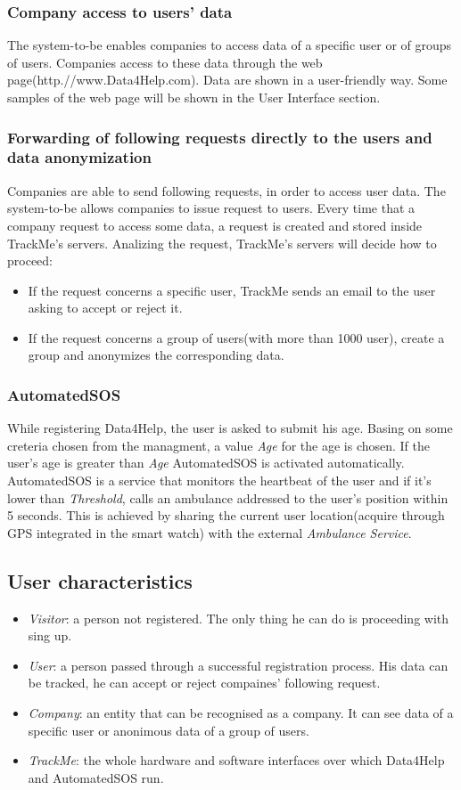 \documentclass{article}
\begin{document}
\subsubsection{Company access to users' data}
The system-to-be enables companies to access data of a specific user or of groups of users. Companies access to these data through the web page(http.//www.Data4Help.com). Data are shown in a user-friendly way. Some samples of the web page will be shown in the User Interface section.
\subsubsection{Forwarding of following requests directly to the users and data anonymization}
Companies are able to send following requests, in order to access user data. The system-to-be allows companies to issue request to users. Every time that a company request to access some data, a request is created and stored inside TrackMe's servers. Analizing the request, TrackMe's servers will decide how to proceed:\\
\begin{itemize}
\item If the request concerns a specific user, TrackMe sends an email to the user asking to accept or reject it.
\item If the request concerns a group of users(with more than 1000 user), create a group and anonymizes the corresponding data. 
\end{itemize}
\subsubsection{AutomatedSOS}
While registering Data4Help, the user is asked to submit his age. Basing on some creteria chosen from the managment, a value \emph{Age} for the age is chosen. If the user's age is greater than \emph{Age} AutomatedSOS is activated automatically. AutomatedSOS is a service that monitors the heartbeat of the user and if it's lower than \emph{Threshold}, calls an ambulance addressed to the user's position within 5 seconds. This is achieved by sharing the current user location(acquire through GPS integrated in the smart watch) with the external \emph{Ambulance Service}.
\subsection{User characteristics}
\begin{itemize}
\item \emph{Visitor}: a person not registered. The only thing he can do is proceeding with sing up.
\item \emph{User}: a person passed through a successful registration process. His data can be tracked, he can accept or reject compaines' following request.
 \item \emph{Company}: an entity that can be recognised as a company. It can see data of a specific user or anonimous data of a group of users. 
 \item \emph{TrackMe}: the whole hardware and software interfaces over which Data4Help and AutomatedSOS run.
\end{itemize}
\end{document}
